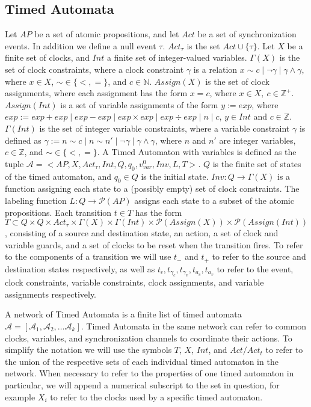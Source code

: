 \documentclass[a4paper,12pt]{article}
\newcommand*\BitOr{\mathbin{|}}
\begin{document}
\subsection{Timed Automata}
\label{sec:orga131ac2}
Let \(AP\) be a set of atomic propositions, and let \(Act\) be a set of
synchronization events. In addition we define a null event \(\tau\).
\(Act_{\tau}\) is the set \(Act \cup \{\tau\}\). Let \(X\) be a finite set of
clocks, and \(Int\) a finite set of integer-valued variables. \(\Gamma(X)\) is
the set of clock constraints, where a clock constraint \(\gamma\) is a relation
\(x \sim c \BitOr \neg \gamma\BitOr \gamma \land \gamma\), where \(x \in X\),
\(\sim \in \{<,=\}\), and \(c \in \mathbb{N}\). \(Assign(X)\) is the set of
clock assignments, where each assignment has the form \(x = c\), where \(x {\in}
X,\ c {\in} \mathbb{Z}^+\). \(Assign(Int)\) is a set of variable assignments of
the form \(y := exp\), where \(exp := exp + exp\BitOr exp - exp\BitOr exp \times
exp\BitOr exp \div exp\BitOr n\BitOr c\), \(y \in Int\) and \(c \in
\mathbb{Z}\). \(\Gamma(Int)\) is the set of integer variable constraints, where
a variable constraint \(\gamma\) is defined as \(\gamma := n \sim c\BitOr n \sim
n'\BitOr \neg \gamma\BitOr \gamma \land \gamma\), where \(n\) and \(n'\) are
integer variables, \(c \in \mathbb{Z}\), and \(\sim \in \{<,=\}\). A Timed
Automaton with variables is defined as the tuple \(\mathcal{A} = <AP,X,
Act_{\tau}, Int, Q, q_0, v_{var}^0, Inv, L, T>\). \(Q\) is the finite set of
states of the timed automaton, and \(q_0 \in Q\) is the initial state. \(Inv : Q
\rightarrow \Gamma(X)\) is a function assigning each state to a (possibly empty)
set of clock constraints. The labeling function \(L: Q \rightarrow
\mathcal{P}(AP)\) assigns each state to a subset of the atomic propositions.
Each transition \(t \in T\) has the form \(T \subset Q \times Q \times
Act_{\tau} \times \Gamma(X) \times \Gamma(Int) \times \mathcal{P}(Assign(X))
\times \mathcal{P}(Assign(Int))\), consisting of a source and destination state,
an action, a set of clock and variable guards, and a set of clocks to be reset
when the transition fires. To refer to the components of a transition we will
use \(t_-\) and \(t_+\) to refer to the source and destination states
respectively, as well as \(t_\epsilon, t_{\gamma_c}, t_{\gamma_v}, t_{a_c},
t_{a_v}\) to refer to the event, clock constraints, variable constraints, clock
assignments, and variable assignments respectively.

A network of Timed Automata is a finite list of timed automata \(\mathcal{A} =
[\mathcal{A}_1, \mathcal{A}_2, \ldots \mathcal{A}_k]\). Timed Automata in the
same network can refer to common clocks, variables, and synchronization channels
to coordinate their actions. To simplify the notation we will use the symbols
\(T\), \(X\), \(Int\), and \(Act/Act_t\) to refer to the union of the respective
sets of each individual timed automaton in the network. When necessary to refer
to the properties of one timed automaton in particular, we will append a
numerical subscript to the set in question, for example \(X_i\) to refer to the
clocks used by a specific timed automaton.
\end{document}
